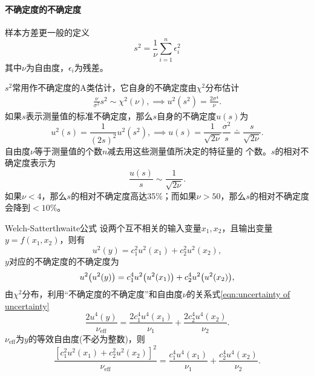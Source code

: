 \paragraph{不确定度的不确定度}
样本方差更一般的定义
\[
	s^2=\frac1\nu\sum_{i=1}^n\epsilon_i^2
\]
其中$\nu$为自由度，$\epsilon_i$为残差。

$s^2$常用作不确定度的A类估计，它自身的不确定度由$\chi^2$分布估计
\begin{align}\label{eqn:uncertainty of uncertainty}
	\frac\nu{\sigma^2}s^2\sim\chi^2(\nu),\implies u^2(s^2)=\frac{2\sigma^4}\nu.\tag{$\ast$}
\end{align}
如果$ s $表示测量值的标准不确定度，那么$ s $自身的不确定度$ u(s) $为
\[
	u^2(s)=\frac1{(2s)^2}u^2(s^2),\implies u(s)=\frac1{\sqrt{2\nu}}\frac{\sigma^2}s\doteq\frac s{\sqrt{2\nu}}.
\]
自由度$\nu$等于测量值的个数$ n $减去用这些测量值所决定的特征量的
个数。$s $的相对不确定度表示为
\[
	\frac{u(s)}s\sim\frac1{\sqrt{2\nu}}.
\]
如果$\nu<4$，那么$ s $的相对不确定度高达35\%；而如果$\nu>50$，那么$ s $的相对不确定度会降到$<10\%$。
\begin{theorem}{Welch-Satterthwaite公式}{}
	设两个互不相关的输入变量$x_1,x_2$，且输出变量$y=f(x_1,x_2)$，则有
	\[
		u^2(y)=c_1^2u^2(x_1)+c_2^2u^2(x_2),
	\]
	$y $对应的不确定度的不确定度为
	\[
		u^2\bigl(u^2(y)\bigr)=c_1^4u^2\bigl(u^2(x_1)\bigr)+c_2^4u^2\bigl(u^2(x_2)\bigr),
	\]
	由$\chi^2$分布，利用“不确定度的不确定度”和自由度$\nu$的关系式\eqref{eqn:uncertainty of uncertainty}
	\[
		\frac{2u^4(y)}{\nu_{\mathrm{eff}}}=\frac{2c_1^4u^4(x_1)}{\nu_1}+\frac{2c_2^4u^4(x_2)}{\nu_2}.
	\]
	$\nu_{\mathrm{eff}}$为$ y $的等效自由度(不必为整数)，则
	\[
		\frac{[c_1^2u^2(x_1)+c_2^2u^2(x_2)]^2}{\nu_{\mathrm{eff}}}=\frac{c_1^4u^4(x_1)}{\nu_1}+\frac{c_2^4u^4(x_2)}{\nu_2}.
	\]
\end{theorem}
